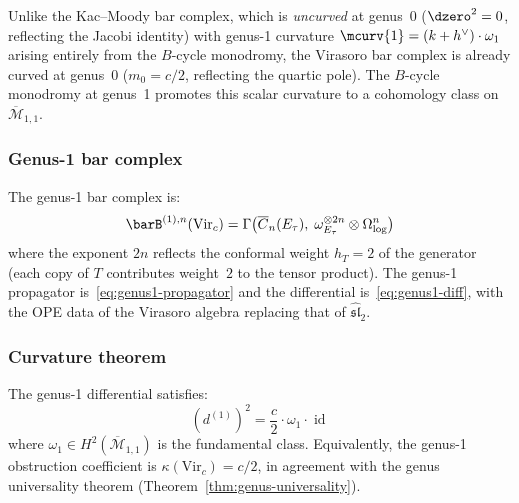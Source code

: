 Unlike the Kac--Moody bar complex, which is
\emph{uncurved} at genus~0 ($\dzero^2 = 0$, reflecting the Jacobi identity) with
genus-1 curvature $\mcurv{1} = (k+h^\vee)\cdot\omega_1$ arising entirely from the $B$-cycle
monodromy, the Virasoro bar complex is already curved at genus~0
($m_0 = c/2$, reflecting the quartic pole).  The $B$-cycle monodromy at
genus~1 promotes this scalar curvature to a cohomology class on
$\overline{\mathcal{M}}_{1,1}$.

\subsubsection{Genus-1 bar complex}

The genus-1 bar complex is:
\begin{equation}\label{eq:vir-genus1-bar}
\barB^{(1),n}(\mathrm{Vir}_c) = \Gamma\bigl(\overline{C}_n(E_\tau),\;
  \omega_{E_\tau}^{\otimes 2n} \otimes \Omega^n_{\log}\bigr)
\end{equation}
where the exponent $2n$ reflects the conformal weight $h_T = 2$ of the
generator (each copy of $T$ contributes weight~$2$ to the tensor product).
The genus-1 propagator is~\eqref{eq:genus1-propagator}
and the differential is~\eqref{eq:genus1-diff}, with the OPE data of the
Virasoro algebra replacing that of $\widehat{\mathfrak{sl}}_2$.

\subsubsection{Curvature theorem}

\begin{theorem}
\label{thm:vir-genus1-curvature}
The genus-1 differential satisfies:
\begin{equation}\label{eq:vir-genus1-dsquared}
(d^{(1)})^2 = \frac{c}{2} \cdot \omega_1 \cdot \operatorname{id}
\end{equation}
where $\omega_1 \in H^2(\overline{\mathcal{M}}_{1,1})$ is the fundamental class.
Equivalently, the genus-1 obstruction coefficient is
$\kappa(\mathrm{Vir}_c) = c/2$, in agreement with the genus universality
theorem (Theorem~\ref{thm:genus-universality}).
\end{theorem}

